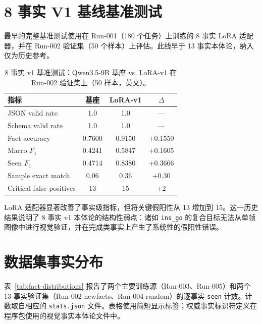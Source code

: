 \section{8 事实 V1 基线基准测试}\label{sec:appendix-8fact}

最早的完整基准测试使用在 Run-001（180 个任务）上训练的 8 事实 LoRA 适配器，并在 Run-002 验证集（50 个样本）上评估。此线早于 13 事实本体论，纳入仅为历史参考。

\begin{table}[htbp]
\centering
\caption{8 事实 v1 基准测试：Qwen3.5-9B 基座 vs. LoRA-v1 在 Run-002 验证集上（50 样本，英文）。}\label{tab:appendix-qwen-8fact}
\begin{tabular}{l c c c}
\toprule
\textbf{指标} & \textbf{基座} & \textbf{LoRA-v1} & \textbf{$\Delta$} \\
\midrule
JSON valid rate       & 1.0    & 1.0    & --- \\
Schema valid rate     & 1.0    & 1.0    & --- \\
Fact accuracy         & 0.7600 & 0.9150 & +0.1550 \\
Macro $F_1$           & 0.4241 & 0.5847 & +0.1605 \\
Seen $F_1$            & 0.4714 & 0.8380 & +0.3666 \\
Sample exact match    & 0.06   & 0.36   & +0.30 \\
Critical false positives & 13  & 15     & +2 \\
\bottomrule
\end{tabular}
\end{table}


LoRA 适配器显著改善了事实级指标，但将关键假阳性从 13 增加到 15。这一历史结果说明了 8 事实 v1 本体论的结构性弱点：诸如 \texttt{ins\_go} 的复合目标无法从单帧图像中进行视觉验证，并在完成类事实上产生了系统性的假阳性错误。

\section{数据集事实分布}\label{sec:appendix-datasets}

表~\ref{tab:fact-distributions} 报告了两个主要训练源（Run-003、Run-005）和两个 13 事实验证集（Run-002 newfacts、Run-004 random）的逐事实 \texttt{seen} 计数。计数取自相应的 \texttt{stats.json} 文件。表格使用简短显示标签；权威事实标识符定义在程序包使用的视觉事实本体论文件中。

